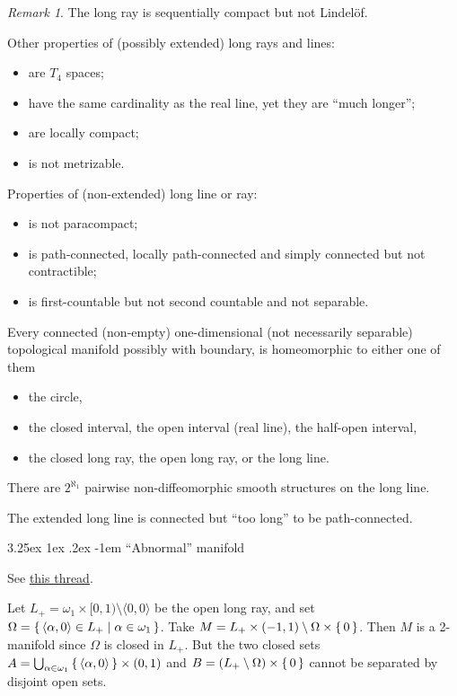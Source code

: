 \documentclass[12pt, letterpaper]{article}
\makeatletter
\renewcommand\subparagraph{\@startsection{subparagraph}{5}{\parindent}%
	{3.25ex \@plus1ex \@minus .2ex}%
	{0.75ex plus 0.1ex}%
	{\normalfont\normalsize\bfseries}}
\renewcommand\subparagraph{\@startsection{subparagraph}{5}{\parindent}%
	{3.25ex \@plus1ex \@minus .2ex}%
	{-1em}%
	{\normalfont\normalsize\bfseries}}
\theoremstyle{definition}
\theoremstyle{remark}
\newtheorem*{rem*}{Remark}
\theoremstyle{definition}
\theoremstyle{plain}
\numberwithin{equation}{section}
\makeatother
\begin{document}
	\begin{rem*}
		The long ray is sequentially compact but not Lindelöf.
		
		Other properties of (possibly extended) long rays and lines:
		\begin{itemize}
			\item are $T_4$ spaces;
			\item have the same cardinality as the real line, yet they are ``much longer'';
			\item are locally compact;
			\item is not metrizable.
		\end{itemize}
	
		Properties of (non-extended) long line or ray:
		\begin{itemize}
			\item is not paracompact;
			\item is path-connected, locally path-connected and simply connected but not contractible;
			\item is first-countable but not second countable and not separable.
		\end{itemize}
	
		Every connected (non-empty) one-dimensional (not necessarily separable) topological manifold possibly with boundary, is homeomorphic to
		either one of them
		\begin{itemize}
			\item the circle,
			\item the closed interval, the open interval (real line), the half-open interval,
			\item the closed long ray, the open long ray, or the long line.
		\end{itemize}
	
		There are $2^{\aleph_1}$ pairwise non-diffeomorphic smooth structures on the long line.
		
		The extended long line is connected but ``too long'' to be path-connected.
	\end{rem*}

	\subparagraph{``Abnormal'' manifold}
	
	See \href{https://mathoverflow.net/questions/149524/abnormal-manifold}{this thread}.
	
	Let $L_+=\omega_1\times[0,1)\setminus\langle0,0\rangle$ be the open long ray,
	and set $\Omega=\set{\langle\alpha,0\rangle\in L_+|\alpha\in\omega_1}$.
	Take $M=L_+\times(-1,1)\setminus\Omega\times\set{0}$.
	Then $M$ is a 2-manifold since $\Omega$ is closed in $L_+$.
	But the two closed sets $A=\bigcup_{\alpha\in\omega_1}\set{\langle\alpha,0\rangle}\times(0,1)$ and $B=(L_+\setminus\Omega)\times\set{0}$
	cannot be separated by disjoint open sets.
\end{document}
